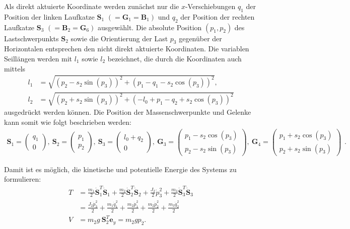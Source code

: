 Als direkt aktuierte Koordinate werden zunächst nur die $x$-Verschiebungen $q_1$ der Position der linken Laufkatze $\mathbf{S}_1$ $(= \mathbf{G}_1 = \mathbf{B}_1)$ und $q_2$ der Position der rechten Laufkatze $\mathbf{S}_3$ $( = \mathbf{B}_2 = \mathbf{G}_6)$ ausgewählt. Die absolute Position $(p_1, p_2)$ des Lastschwerpunkts $\mathbf{S}_2$ sowie die Orientierung der Last $p_3$ gegenüber der Horizontalen entsprechen den nicht direkt aktuierte Koordinaten. Die variablen Seillängen werden mit $l_1$ sowie $l_2$ bezeichnet, die durch die Koordinaten auch mittels
\begin{align}
l_1 &= \sqrt{\left(p_{2} - s_{2} \sin{\left(p_{3} \right)}\right)^{2} + \left(p_{1} - q_{1} - s_{2} \cos{\left(p_{3} \right)}\right)^{2}}, \\
l_2 &= \sqrt{\left(p_{2} + s_{2} \sin{\left(p_{3} \right)}\right)^{2} + \left(- l_{0} + p_{1} - q_{2} + s_{2} \cos{\left(p_{3} \right)}\right)^{2}}
\end{align}
ausgedrückt werden können. Die Position der Massenschwerpunkte und Gelenke kann somit wie folgt beschrieben werden:
\begin{equation}
\begin{smallmatrix}
\mathbf{S}_1 =
\begin{pmatrix}
q_1 \\
0
\end{pmatrix}, 
\
\mathbf{S}_2 =
\begin{pmatrix}
p_1 \\
p_2
\end{pmatrix},
\
\mathbf{S}_3 =
\begin{pmatrix}
l_0 + q_2 \\
0
\end{pmatrix},
\
\mathbf{G}_3 =
\left(\begin{matrix}
p_{1} - s_{2} \cos{\left(p_{3} \right)}\\
p_{2} - s_{2} \sin{\left(p_{3} \right)}
\end{matrix}\right),
\
\mathbf{G}_4 =
\left(\begin{matrix}
p_{1} + s_{2} \cos{\left(p_{3} \right)}\\
p_{2} + s_{2} \sin{\left(p_{3} \right)}
\end{matrix}\right)
\end{smallmatrix}.
\end{equation}

Damit ist es möglich, die kinetische und potentielle Energie des Systems zu formulieren:
\begin{align}
T &= \frac{m_1}{2} \dot{\mathbf{S}}_1^T \dot{\mathbf{S}}_1 + \frac{m_2}{2} \dot{\mathbf{S}}_2^T \dot{\mathbf{S}}_2 + \frac{J_2}{2} \dot{p}_3^2 + \frac{m_3}{2} \dot{\mathbf{S}}_3^T \dot{\mathbf{S}}_3 \nonumber \\  
&= \frac{J_{2} \dot{p}_{3}^{2}}{2} + \frac{m_{1} \dot{q}_{1}^{2}}{2} + \frac{m_{2} \dot{p}_{1}^{2}}{2} + \frac{m_{2} \dot{p}_{2}^{2}}{2} + \frac{m_{3} \dot{q}_{2}^{2}}{2} \\
V &= m_2 g \ \mathbf{S}_2^T \mathbf{e}_y = m_{2} g p_{2}.
\end{align}


